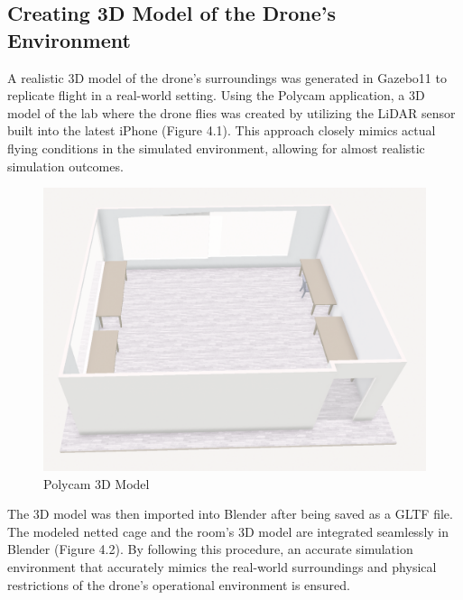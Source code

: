         \subsection{Creating 3D Model of the Drone's Environment}
        \color{black}
        A realistic 3D model of the drone's surroundings was generated in Gazebo11 to replicate flight in a real-world setting. Using the Polycam application, a 3D model of the lab where the drone flies was created by utilizing the LiDAR sensor built into the latest iPhone (Figure 4.1). This approach closely mimics actual flying conditions in the simulated environment, allowing for almost realistic simulation outcomes.
        \begin{figure}[H]
            \centering
            \includegraphics[width=0.6\linewidth]{Images/3D Model.png}
            \caption{Polycam 3D Model}
            \label{poly}
        \end{figure}
        The 3D model was then imported into Blender after being saved as a GLTF file. The modeled netted cage and the room's 3D model are integrated seamlessly in Blender (Figure 4.2). By following this procedure, an accurate simulation environment that accurately mimics the real-world surroundings and physical restrictions of the drone's operational environment is ensured.
